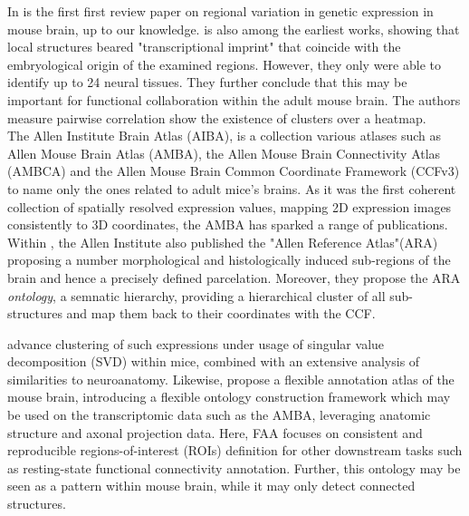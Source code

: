\documentclass[]{article}
\renewcommand{\cite}{\citep}
\begin{document}
In \citet{pavlidis_analysis_2001} is the first first review paper on regional variation in genetic expression in mouse brain, up to our knowledge.  
\citet{zapala2005adult} is also among the earliest works, showing that local structures beared "transcriptional imprint" that coincide with the embryological origin of the examined regions. However, they only were able to identify up to 24 neural tissues. They further conclude that this may be important for functional collaboration within the adult mouse brain. The authors measure pairwise correlation show the existence of clusters over a heatmap. \\

The Allen Institute Brain Atlas (AIBA), is a collection various atlases such as Allen Mouse Brain Atlas (AMBA)\cite{MouseBrainAtlas, daigle2018suite}, the Allen Mouse Brain Connectivity Atlas (AMBCA) \cite{oh2014mesoscale, harris2019hierarchical} and the Allen Mouse Brain Common Coordinate Framework (CCFv3) \cite{wang2020allen} to name only the ones related to adult mice's brains. As it was the first coherent collection of spatially resolved expression values, mapping 2D expression images consistently to 3D coordinates, the AMBA has sparked a range of publications. Within \citet{MouseBrainAtlas}, the Allen Institute also published the "Allen Reference Atlas"(ARA) proposing a number morphological and histologically induced sub-regions of the brain and hence a precisely defined parcelation. Moreover, they propose the ARA \textit{ontology}, a semnatic hierarchy, providing a hierarchical cluster of all sub-structures and map them back to their coordinates with the CCF. 


\citet{bohland2010clustering} advance clustering of such expressions under usage of singular value decomposition (SVD) within mice, combined with an extensive analysis of similarities to neuroanatomy.
Likewise, \citet{takata_flexible_2021} propose a flexible annotation atlas of the mouse brain, introducing a flexible ontology construction framework which may be used on the transcriptomic data such as the AMBA, leveraging anatomic structure and axonal projection data. Here, FAA focuses on consistent and reproducible regions-of-interest (ROIs) definition for other downstream tasks such as resting-state functional connectivity annotation. Further, this ontology may be seen as a pattern within mouse brain, while it may only detect connected structures. 
\end{document}
